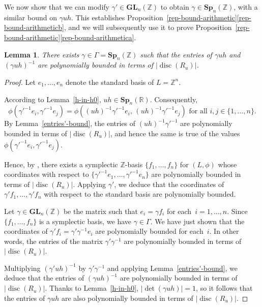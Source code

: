 \documentclass[JEP,XML,SOM,Unicode,NoFloatCountersInSection]{cedram}
\newcommand{\bR}{\mathbb{R}}
\newcommand{\bZ}{\mathbb{Z}}
\newcommand{\gGL}{\mathbf{GL}}
\newcommand{\gSp}{\mathbf{Sp}}
\DeclareMathOperator{\disc}{disc}
\newcommand{\abs}[1]{\lvert #1 \rvert}
\newtheorem{lemma}{Lemma}[section]
\begin{document}
We now show that we can modify $\gamma' \in \gGL_n(\bZ)$ to obtain $\gamma \in \gSp_n(\bZ)$, with a similar bound on $\gamma uh$. This establishes Proposition~\ref{rep-bound-arithmetic}\eqref{rep-bound-arithmeticb}, and we will subsequently use it to prove Proposition~\ref{rep-bound-arithmetic}\eqref{rep-bound-arithmetica}.

\begin{lemma} \label{entries-bound}
There exists $\gamma \in \Gamma = \gSp_n(\bZ)$ such that the entries of $\gamma uh$ and $(\gamma uh)^{-1}$ are polynomially bounded in terms of $\abs{\disc(R_u)}$.
\end{lemma}

\begin{proof}
Let $e_1, \dotsc, e_n$ denote the standard basis of $L = \bZ^n$.

According to Lemma~\ref{h-in-h0}, $uh \in \gSp_n(\bR)$.
Consequently,
\[
\phi(\gamma'^{-1} e_i, \gamma'^{-1} e_j) = \phi((uh)^{-1}\gamma'^{-1} e_i, \, (uh)^{-1} \gamma'^{-1} e_j) \text{ for all } i, j \in \{ 1, \dotsc, n \}.
\]
By Lemma~\ref{entries'-bound}, the entries of $(uh)^{-1} \gamma'^{-1}$ are polynomially bounded in terms of $\abs{\disc(R_u)}$, and hence the same is true of the values $\phi(\gamma'^{-1} e_i, \gamma'^{-1} e_j)$.

Hence, by \cite[Lem.\,4.3]{Orr15}, there exists a symplectic $\bZ$-basis $\{ f_1, \dotsc, f_n \}$ for $(L, \phi)$ whose coordinates with respect to $\{ \gamma'^{-1}e_1, \dotsc, \gamma'^{-1}e_n \}$ are polynomially bounded in terms of $\abs{\disc(R_u)}$.
Applying $\gamma'$, we deduce that the coordinates of $\gamma' f_1, \dotsc, \gamma' f_n$ with respect to the standard basis are polynomially bounded.

Let $\gamma \in \gGL_n(\bZ)$ be the matrix such that $e_i = \gamma f_i$ for each~$i = 1, \dotsc, n$.
Since $\{ f_1, \dotsc, f_n \}$ is a symplectic basis, we have $\gamma \in \Gamma$.
We have just shown that the coordinates of $\gamma' f_i = \gamma' \gamma^{-1} e_i$ are polynomially bounded for each~$i$.
In other words, the entries of the matrix $\gamma' \gamma^{-1}$ are polynomially bounded in terms of $\abs{\disc(R_u)}$.

Multiplying $(\gamma'uh)^{-1}$ by $\gamma' \gamma^{-1}$ and applying Lemma~\ref{entries'-bound}, we deduce that the entries of $(\gamma uh)^{-1}$ are polynomially bounded in terms of $\abs{\disc(R_u)}$.
Thanks to Lemma~\ref{h-in-h0}, $\abs{\det(\gamma uh)} = 1$,
so it follows that the entries of $\gamma uh$ are also polynomially bounded in terms of $\abs{\disc(R_u)}$.
\end{proof}
\end{document}
